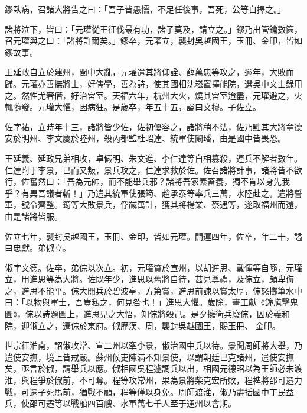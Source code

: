 \begin{pinyinscope}
 鏐臥病，召諸大將告之曰：「吾子皆愚懦，不足任後事，吾死，公等自擇之。」



 諸將泣下，皆曰：「元瓘從王征伐最有功，諸子莫及，請立之。」鏐乃出管鑰數篋，召元瓘與之曰：「諸將許爾矣。」鏐卒，元瓘立，襲封吳越國王，玉冊、金印，皆如鏐故事。



 王延政自立於建州，閩中大亂，元瓘遣其將仰詮、薛萬忠等攻之，逾年，大敗而歸。元瓘亦善撫將士，好儒學，善為詩，使其國相沈崧置擇能院，選吳中文士錄用之。然性尤奢僭，好治宮室。天福六年，杭州大火，燒其宮室迨盡，元瓘避之，火輒隨發。元瓘大懼，因病狂。是歲卒，年五十五，謚曰文穆。子佐立。



 佐字祐，立時年十三，諸將皆少佐，佐初優容之，諸將稍不法，佐乃黜其大將章德安於明州、李文慶於睦州，殺內都監杜昭達、統軍使闞璠，由是國中皆畏恐。



 王延義、延政兄弟相攻，卓儼明、朱文進、李仁達等自相篡殺，連兵不解者數年。仁達附于李景，已而又叛，景兵攻之，仁達求救於佐。佐召諸將計事，諸將皆不欲行，佐奮然曰：「吾為元帥，而不能舉兵邪？諸將吾家素畜養，獨不肯以身先我乎？有異吾議者斬！」乃遣其統軍使張筠、趙承泰等率兵三萬，水陸赴之。遣將誓軍，號令齊整。筠等大敗景兵，俘馘萬計，獲其將楊業、蔡遇等，遂取福州而還，
 由是諸將皆服。



 佐立七年，襲封吳越國王，玉冊、金印，皆如元瓘。開運四年，佐卒，年二十，謚曰忠獻。弟俶立。



 俶字文德。佐卒，弟倧以次立。初，元瓘質於宣州，以胡進思、戴惲等自隨，元瓘立，用進思等為大將。佐既年少，進思以舊將自待，甚見尊禮，及倧立，頗卑侮之，進思不能平。倧大閱兵於碧波亭，方第賞，進思前諫以賞太厚，倧怒擲筆水中曰：「以物與軍士，吾豈私之，何見咎也！」進思大懼。歲除，畫工獻《鐘馗擊鬼圖》，倧以詩題圖上，進思見之大悟，知倧將殺己。是夕擁衛兵廢倧，囚於義和院，迎俶立之，遷倧於東府。俶歷漢、周，襲封吳越國王，賜玉冊、
 金印。



 世宗征淮南，詔俶攻常、宣二州以牽李景，俶治國中兵以待。景聞周師將大舉，乃遣使安撫，境上皆戒嚴。蘇州候吏陳滿不知景使，以謂朝廷已克諸州，遣使安撫矣，亟言於俶，請舉兵以應。俶相國吳程遽調兵以出，相國元德昭以為王師必未渡淮，與程爭於俶前，不可奪。程等攻常州，果為景將柴克宏所敗，程裨將邵可遷力戰，可遷子死馬前，猶戰不顧，程等僅以身免。周師渡淮，俶乃盡括國中丁民益兵，使邵可遷等以戰船四百艘、水軍萬七千人至于通州以會期。




\end{pinyinscope}
